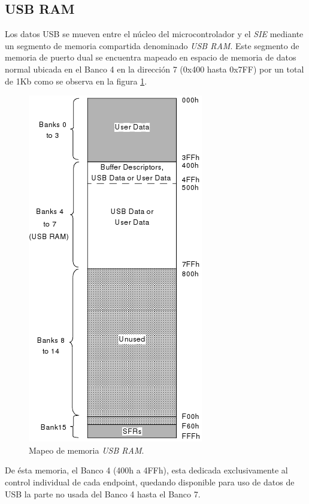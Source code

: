 \subsection{USB RAM}
Los datos USB se mueven entre el n\'ucleo del microcontrolador y el \emph{SIE}
mediante un segmento de memoria compartida denominado \emph{USB RAM}.
Este segmento de memoria de puerto dual se encuentra mapeado en espacio de
memoria de datos normal ubicada en el Banco 4 en la direcci\'on 7 (0x400 hasta
0x7FF) por un total de 1Kb como se observa en la figura \ref{fig:usb_mem}.

\begin{figure}
\centering
\includegraphics[scale=0.6]{./img/usb_mem.png}
\caption{Mapeo de memoria \emph{USB RAM}.}
\label{fig:usb_mem}
\end{figure}

De \'esta memoria, el Banco 4 (400h a 4FFh), esta dedicada exclusivamente al
control individual de cada endpoint, quedando disponible para uso de datos de
USB la parte no usada del Banco 4 hasta el Banco 7.\\

